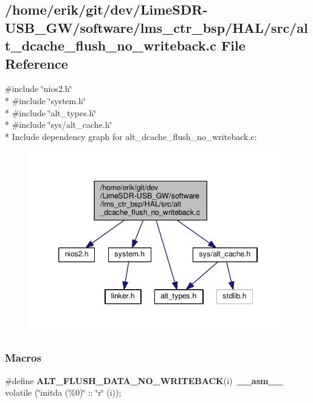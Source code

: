 \subsection{/home/erik/git/dev/\+Lime\+S\+D\+R-\/\+U\+S\+B\+\_\+\+G\+W/software/lms\+\_\+ctr\+\_\+bsp/\+H\+A\+L/src/alt\+\_\+dcache\+\_\+flush\+\_\+no\+\_\+writeback.c File Reference}
\label{alt__dcache__flush__no__writeback_8c}
{\ttfamily \#include \char`\"{}nios2.\+h\char`\"{}}\\*
{\ttfamily \#include \char`\"{}system.\+h\char`\"{}}\\*
{\ttfamily \#include \char`\"{}alt\+\_\+types.\+h\char`\"{}}\\*
{\ttfamily \#include \char`\"{}sys/alt\+\_\+cache.\+h\char`\"{}}\\*
Include dependency graph for alt\+\_\+dcache\+\_\+flush\+\_\+no\+\_\+writeback.\+c\+:
\nopagebreak
\begin{figure}[H]
\begin{center}
\leavevmode
\includegraphics[width=346pt]{d3/de2/alt__dcache__flush__no__writeback_8c__incl}
\end{center}
\end{figure}
\subsubsection*{Macros}
\begin{DoxyCompactItemize}
\item 
\#define {\bf A\+L\+T\+\_\+\+F\+L\+U\+S\+H\+\_\+\+D\+A\+T\+A\+\_\+\+N\+O\+\_\+\+W\+R\+I\+T\+E\+B\+A\+CK}(i)~{\bf \+\_\+\+\_\+asm\+\_\+\+\_\+} volatile (\char`\"{}initda (\%0)\char`\"{} \+:: \char`\"{}r\char`\"{} (i));
\end{DoxyCompactItemize}
